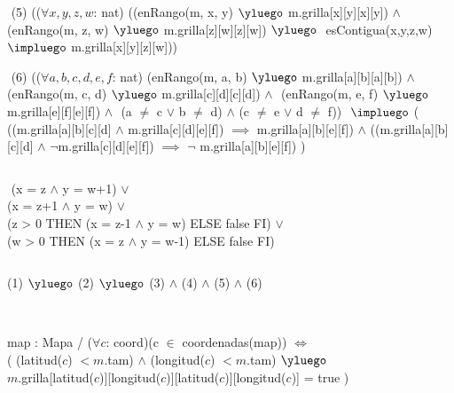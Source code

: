 \begin{Representacion}
$ $\newline
(5)
(($\forall x, y, z, w$: nat)$ $\newline
((enRango(m, x, y) $\yluego$ m.grilla[x][y][x][y]) $\land$ $ $\newline
(enRango(m, z, w) $\yluego$ m.grilla[z][w][z][w]) $\yluego$ $ $\newline
esContigua(x,y,z,w) $\impluego$ m.grilla[x][y][z][w]))


$ $\newline
(6)
(($\forall a, b, c, d, e, f$: nat)$ $\newline
(enRango(m, a, b) $\yluego$ m.grilla[a][b][a][b]) $\land$ $ $\newline
(enRango(m, c, d) $\yluego$ m.grilla[c][d][c][d]) $\land$ $ $\newline
(enRango(m, e, f) $\yluego$ m.grilla[e][f][e][f]) $\land$ $ $\newline
(a $\neq$ c $\lor$ b $\neq$ d) $\land$ (c $\neq$ e $\lor$ d $\neq$ f)) $ $\newline
$\impluego$ ( $ $\newline
((m.grilla[a][b][c][d] $\land$ m.grilla[c][d][e][f]) $\implies$ m.grilla[a][b][e][f]) $\land $\newline
((m.grilla[a][b][c][d] $\land$ $\neg$m.grilla[c][d][e][f]) $\implies$ $\neg$ m.grilla[a][b][e][f])$ $\newline
)

$ $\newline
{}%

$ $\newline
{}%
{
(x = z $\land$ y = w+1) $\lor$ \\
(x = z+1 $\land$ y = w) $\lor$ \\
(\IF z > 0 THEN (x = z-1 $\land$ y = w) ELSE false FI) $\lor$ \\
(\IF w > 0 THEN (x = z $\land$ y = w-1) ELSE false FI)
} 


$ $\newline

%
{{(1) $\yluego$ (2) $\yluego$ (3) $\land$ (4) $\land$ (5) $\land$ (6)}} 

$ $\newline
$ $\newline



%
{map : Mapa / ($\forall c$: coord)(c $\in$ coordenadas(map)) $\iff$ \\
( (latitud($c$) $< m$.tam) $\land$ (longitud($c$) $< m$.tam) $\yluego$ \\
\hspace{1cm}	$m$.grilla[latitud($c$)][longitud($c$)][latitud($c$)][longitud($c$)] = true )}%

\end{Representacion}

